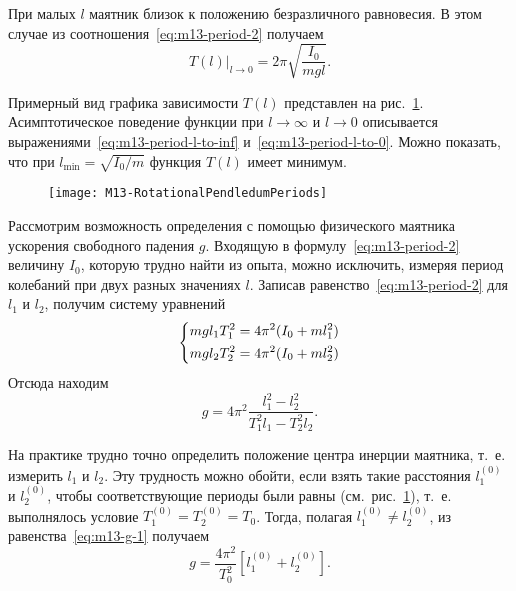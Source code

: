 \documentclass[a4paper, 12pt]{extarticle}
\begin{document}
При малых $l$ маятник близок к положению безразличного равновесия. В этом случае из соотношения~\eqref{eq:m13-period-2} получаем
\begin{equation}
\label{eq:m13-period-l-to-0}
\left. T(l) \right|_{l \to 0} = 2 \pi \sqrt{\frac{I_0}{mgl}}.
\end{equation}

Примерный вид графика зависимости $T(l)$ представлен на рис.~\ref{fig:m13-plot}. Асимптотическое поведение функции при $l \to \infty$ и $l \to 0$ описывается выражениями~\eqref{eq:m13-period-l-to-inf} и~\eqref{eq:m13-period-l-to-0}.  %
Можно показать, что при $l_{\min} = \sqrt{I_0 / m}$ функция $T(l)$ имеет минимум. %

\begin{figure}[h]
\begin{center}
\texttt{[image: M13-RotationalPendledumPeriods]}
\end{center}
\caption{\label{fig:m13-plot}}
\end{figure}

Рассмотрим возможность определения с помощью физического маятника ускорения свободного падения $g$. Входящую в формулу~\eqref{eq:m13-period-2} величину $I_0$, которую трудно найти из опыта, можно исключить, измеряя период колебаний при двух разных значениях $l$. Записав равенство~\eqref{eq:m13-period-2} для $l_1$ и $l_2$, получим систему уравнений %
\begin{equation}
\label{eq:m13-system}
\left\{ \aligned
m g l_1 T_1^2 = 4 \pi^2 (I_0 + m l_1^2) \\
m g l_2 T_2^2 = 4 \pi^2 (I_0 + m l_2^2)
\endaligned \right.
\end{equation}
Отсюда находим
\begin{equation}
\label{eq:m13-g-1}
g = 4 \pi^2 \frac{l_1^2 - l_2^2}{T_1^2 l_1 - T_2^2 l_2}.
\end{equation}

На практике трудно точно определить положение центра инерции маятника, т.~е. измерить $l_1$ и $l_2$. Эту трудность можно обойти, если взять такие расстояния $l_1^{(0)}$ и $l_2^{(0)}$, чтобы соответствующие периоды были равны (см.~рис.~\ref{fig:m13-plot}), т.~е. выполнялось условие $T_1^{(0)} = T_2^{(0)} = T_0$. Тогда, полагая $l_1^{(0)} \ne l_2^{(0)}$, из равенства~\eqref{eq:m13-g-1} получаем %
\begin{equation}
\label{eq:m13-g-2}
g = \frac{4 \pi^2}{T_0^2} \left[ l_1^{(0)} + l_2^{(0)} \right] .
\end{equation}
\end{document}

